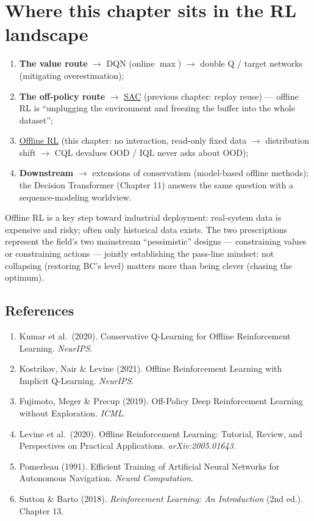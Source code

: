 \documentclass{article}
\begin{document}
\section*{Where this chapter sits in the RL landscape}

\begin{enumerate}
  \item \textbf{The value route} $\to$ DQN (online $\max$) $\to$ double Q / target networks (mitigating overestimation);
  \item \textbf{The off-policy route} $\to$ \underline{SAC} (previous chapter: replay reuse) --- offline RL is ``unplugging the environment and freezing the buffer into the whole dataset'';
  \item \underline{Offline RL} (this chapter: no interaction, read-only fixed data $\to$ distribution shift $\to$ CQL devalues OOD / IQL never asks about OOD);
  \item \textbf{Downstream} $\to$ extensions of conservatism (model-based offline methods); the Decision Transformer (Chapter 11) answers the same question with a sequence-modeling worldview.
\end{enumerate}

Offline RL is a key step toward industrial deployment: real-system data is expensive and risky; often only historical data exists. The two prescriptions represent the field's two mainstream ``pessimistic'' designs --- constraining values or constraining actions --- jointly establishing the pass-line mindset: not collapsing (restoring BC's level) matters more than being clever (chasing the optimum).

\subsection*{References}

\begin{enumerate}
  \item Kumar et al.\ (2020). Conservative Q-Learning for Offline Reinforcement Learning. \textit{NeurIPS}.
  \item Kostrikov, Nair \& Levine (2021). Offline Reinforcement Learning with Implicit Q-Learning. \textit{NeurIPS}.
  \item Fujimoto, Meger \& Precup (2019). Off-Policy Deep Reinforcement Learning without Exploration. \textit{ICML}.
  \item Levine et al.\ (2020). Offline Reinforcement Learning: Tutorial, Review, and Perspectives on Practical Applications. \textit{arXiv:2005.01643}.
  \item Pomerleau (1991). Efficient Training of Artificial Neural Networks for Autonomous Navigation. \textit{Neural Computation}.
  \item Sutton \& Barto (2018). \textit{Reinforcement Learning: An Introduction} (2nd ed.). Chapter 13.
\end{enumerate}
\end{document}
